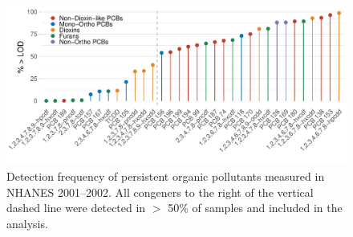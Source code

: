 \begin{landscape}
\begin{figure}
    \centering
\includegraphics[scale=0.55]{figures/pop_detect.pdf}
   \caption{Detection frequency of persistent organic pollutants measured in NHANES 2001--2002. All congeners to the right of the vertical dashed line were detected in $>$ 50\% of samples and included in the analysis.}
    \label{fig:detect}
\end{figure}
\end{landscape}

